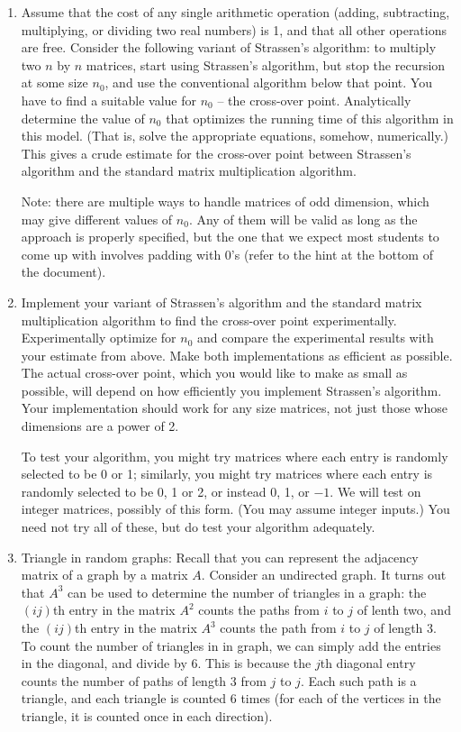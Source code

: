\documentclass[11pt]{article}
\begin{document}

\begin{enumerate}

\item Assume that the cost of any single arithmetic operation (adding,
subtracting, multiplying, or dividing two real numbers) is 1, and that
all other operations are free.  Consider the following variant of
Strassen's algorithm: to multiply two $n$ by $n$ matrices, start using
Strassen's algorithm, but stop the recursion at some size $n_0$, and
use the conventional algorithm below that point.  You have to find a
suitable value for $n_0$ -- the cross-over point.  Analytically
determine the value of $n_0$ that optimizes the running time of this
algorithm in this model.  (That is, solve the appropriate equations, somehow,
numerically.)
This gives a crude estimate for the cross-over point between
Strassen's algorithm and the standard matrix multiplication algorithm.

\medskip Note: there are multiple ways to handle matrices of odd dimension, which may give different values of $n_0$. Any of them will be valid as long as the approach is properly specified, but the one that we expect most students to come up with involves padding with 0's (refer to the hint at the bottom of the document).
\item Implement your variant of Strassen's algorithm and the standard
matrix multiplication algorithm to find the cross-over point
experimentally.  Experimentally optimize for $n_0$ and compare the
experimental results with your estimate from above.  Make both
implementations as efficient as possible.  The actual cross-over
point, which you would like to make as small as possible, will depend
on how efficiently you implement Strassen's algorithm.  Your implementation
should work for any size matrices, not just those whose dimensions are a power
of 2.

To test your algorithm, you might try matrices where each entry is
randomly selected to be 0 or 1; similarly, you might try matrices
where each entry is randomly selected to be 0, 1 or 2, or instead 0,
1, or $-1$.  We will test on integer matrices, possibly of this form.
(You may assume integer inputs.)  You need not try all of these, but
do test your algorithm adequately.

\item Triangle in random graphs:  Recall that you can represent the
adjacency matrix of a graph by a matrix $A$.  Consider an undirected
graph.  It turns out that $A^3$ can be used to determine the number
of triangles in a graph: the $(ij)$th entry
in the matrix $A^2$ counts the paths from $i$ to $j$ of lenth two,
and the $(ij)$th entry in the matrix $A^3$ counts the path from $i$ to
$j$ of length 3.  To count the number of triangles in in graph, we can
simply add the entries in the diagonal, and divide by 6.  This is because
the $j$th diagonal entry counts the number of paths of length 3 from $j$
to $j$.  Each such path is a triangle, and each triangle is counted 6 times
(for each of the vertices in the triangle, it is counted once in each direction).  


\end{enumerate}
\end{document}

